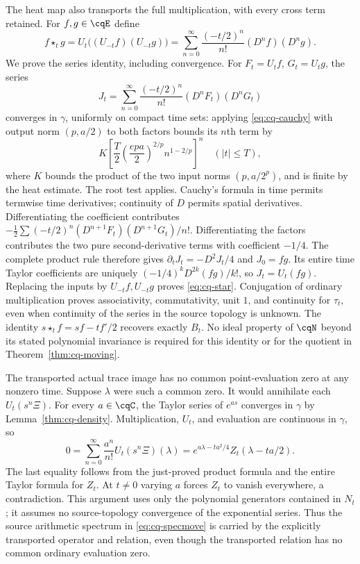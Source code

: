 The heat map also transports the full multiplication, with every
cross term retained. For $f,g\in\cqE$ define
\begin{equation}\label{eq:cq-star}
 f\star_t g=U_t\bigl((U_{-t}f)(U_{-t}g)\bigr)
    =\sum_{n=0}^\infty\frac{(-t/2)^n}{n!}(D^nf)(D^ng).
\end{equation}
We prove the series identity, including convergence. For
$F_t=U_tf$, $G_t=U_tg$, the series
\[
 J_t=\sum_{n=0}^\infty\frac{(-t/2)^n}{n!}
                    (D^nF_t)(D^nG_t)
\]
converges in $\gamma$, uniformly on compact time sets: applying
\eqref{eq:cq-cauchy} with output norm $(p,a/2)$ to both factors
bounds its $n$th term by
\[
 K\left[\frac T2\left(\frac{epa}{2}\right)^{2/p}
                   n^{1-2/p}\right]^n\quad(|t|\leq T),
\]
where $K$ bounds the product of the two input norms
$(p,a/2^p)$, and is finite by the heat estimate. The root test
applies. Cauchy's formula in time permits termwise time derivatives;
continuity of $D$ permits spatial derivatives. Differentiating the
coefficient contributes
$-\tfrac12\sum(-t/2)^n(D^{n+1}F_t)(D^{n+1}G_t)/n!$.
Differentiating the factors contributes the two pure second-derivative
terms with coefficient $-1/4$. The complete product rule therefore
gives $\partial_tJ_t=-D^2J_t/4$ and $J_0=fg$.
Its entire time Taylor coefficients are uniquely
$(-1/4)^kD^{2k}(fg)/k!$, so $J_t=U_t(fg)$.
Replacing the inputs by $U_{-t}f,U_{-t}g$ proves
\eqref{eq:cq-star}. Conjugation of ordinary multiplication proves
associativity, commutativity, unit $1$, and continuity for $\tau_t$,
even when continuity of the series in the source topology is unknown.
The identity $s\star_t f=sf-tf'/2$ recovers exactly $B_t$.
No ideal property of $\cqN$ beyond its stated polynomial invariance
is required for this identity or for the quotient in
Theorem~\ref{thm:cq-moving}.

The transported actual trace image has no common point-evaluation
zero at any nonzero time. Suppose $\lambda$ were such a common
zero. It would annihilate each $U_t(s^n\Xi)$. For every $a\in\cqC$,
the Taylor series of $e^{as}$ converges in $\gamma$ by
Lemma~\ref{thm:cq-density}. Multiplication, $U_t$, and evaluation
are continuous in $\gamma$, so
\[
 0=\sum_{n=0}^\infty\frac{a^n}{n!}U_t(s^n\Xi)(\lambda)
   =e^{a\lambda-ta^2/4}Z_t(\lambda-ta/2).
\]
The last equality follows from the just-proved product formula
and the entire Taylor formula for $Z_t$. At $t\ne0$ varying $a$
forces $Z_t$ to vanish everywhere, a contradiction. This argument
uses only the polynomial generators contained in $N_t$; it assumes
no source-topology convergence of the exponential series. Thus the
source arithmetic spectrum in \eqref{eq:cq-specmove} is carried by
the explicitly transported operator and relation, even though the
transported relation has no common ordinary evaluation zero.

